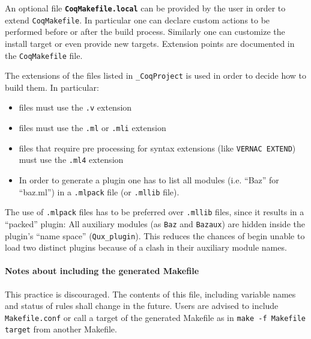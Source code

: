 An optional file {\bf {\tt CoqMakefile.local}} can be provided by the user in order to extend {\tt CoqMakefile}.  In particular one can declare custom actions to be performed before or after the build process. Similarly one can customize the install target or even provide new targets.  Extension points are documented in the {\tt CoqMakefile} file.

The extensions of the files listed in {\tt \_CoqProject} is
used in order to decide how to build them.  In particular:

\begin{itemize}
\item {\Coq} files must use the \texttt{.v} extension
\item {\ocaml} files must use the \texttt{.ml} or \texttt{.mli} extension
\item {\ocaml} files that require pre processing for syntax extensions (like {\tt VERNAC EXTEND}) must use the \texttt{.ml4} extension
\item In order to generate a plugin one has to list all {\ocaml} modules (i.e. ``Baz'' for ``baz.ml'') in a \texttt{.mlpack} file (or \texttt{.mllib} file).
\end{itemize}

The use of \texttt{.mlpack} files has to be preferred over \texttt{.mllib}
files, since it results in a ``packed'' plugin: All auxiliary 
modules (as {\tt Baz} and {\tt Bazaux}) are hidden inside
the plugin's ``name space'' ({\tt Qux\_plugin}).
This reduces the chances of begin unable to load two distinct plugins
because of a clash in their auxiliary module names.

\paragraph{Notes about including the generated Makefile}

This practice is discouraged. The contents of this file, including variable names
and status of rules shall change in the future.  Users are advised to
include {\tt Makefile.conf} or call a target of the generated Makefile
as in {\tt make -f Makefile target} from another Makefile.

